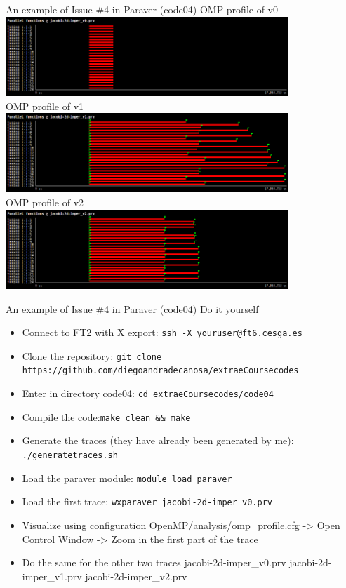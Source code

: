 \documentclass[10pt,xcolor=table]{beamer}
\begin{document}
\begin{frame}{An example of Issue \#4 in Paraver (code04)}
\centering
OMP profile of v0\\
\includegraphics[width=0.8\textwidth]{figs/Parallel_functions@jacobi-2d-imper_v0.png}\\
OMP profile of v1\\
\includegraphics[width=0.8\textwidth]{figs/Parallel_functions@jacobi-2d-imper_v1.png}\\
OMP profile of v2\\
\includegraphics[width=0.8\textwidth]{figs/Parallel_functions@jacobi-2d-imper_v2.png}\\
\end{frame}

\begin{frame}{An example of Issue \#4 in Paraver (code04)}
Do it yourself
\begin{itemize}
    \item Connect to FT2 with X export: {\tt ssh -X youruser@ft6.cesga.es}
    \item Clone the repository: {\tt git clone https://github.com/diegoandradecanosa/extraeCoursecodes}
    \item Enter in directory code04: {\tt cd extraeCoursecodes/code04}
        \item Compile the code:{\tt make clean \&\& make}
    \item Generate the traces (they have already been generated by me): {\tt ./generatetraces.sh}
    \item Load the paraver module:  {\tt module load paraver}
    \item Load the first trace: {\tt wxparaver jacobi-2d-imper\_v0.prv}
    \item Visualize using configuration OpenMP/analysis/omp\_profile.cfg -> Open Control Window -> Zoom in the first part of the trace
    \item Do the same for the other two traces jacobi-2d-imper\_v0.prv jacobi-2d-imper\_v1.prv jacobi-2d-imper\_v2.prv
\end{itemize}
\end{frame}
\end{document}
